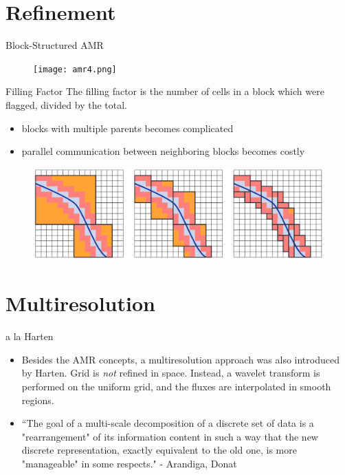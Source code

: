 \documentclass{beamer}
\begin{document}
\section{Refinement}

\begin{frame}{Block-Structured AMR}
    \begin{figure}
        \center
        \texttt{[image: amr4.png]}
    \end{figure}
\end{frame}

\begin{frame}{Filling Factor}
    The filling factor is the number of cells in a block which were flagged, divided by the total.
    \begin{itemize}
        \item<2-> blocks with multiple parents becomes complicated
        \item<3-> parallel communication between neighboring blocks becomes costly
    \end{itemize}
    \begin{figure}
        \center
        \includegraphics[scale=0.18]{filling.png}
    \end{figure}
\end{frame}

\section{Multiresolution}

\begin{frame}{a la Harten}
    \begin{itemize}
        \item<1-> Besides the AMR concepts, a multiresolution approach was also introduced by
            Harten. Grid is \textit{not} refined in space. Instead, a wavelet
            transform is performed on the uniform grid, and the fluxes are
            interpolated in smooth regions. \\
        \item<2->``The goal of a multi-scale decomposition of a discrete set of
            data is a "rearrangement" of its information content in such a way
            that the new discrete representation, exactly equivalent to the old
            one, is more "manageable" in some respects." - Arandiga, Donat
    \end{itemize}
\end{frame}
\end{document}
